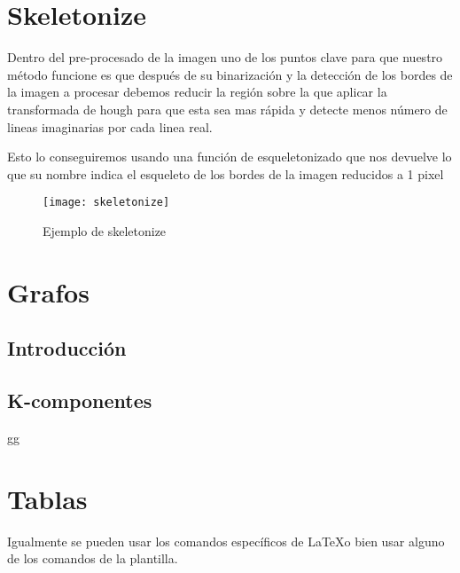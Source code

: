 \section{Skeletonize \cite{scik:skeleton}}
Dentro del pre-procesado de la imagen uno de los puntos clave para que nuestro método funcione es que después de su binarización y la detección de los bordes de la imagen a procesar debemos reducir la región sobre la que aplicar la transformada de hough para que esta sea mas rápida y detecte menos número de lineas imaginarias por cada linea real.

Esto lo conseguiremos usando una función de esqueletonizado que nos devuelve lo que su nombre indica el esqueleto de los bordes de la imagen reducidos a 1 pixel \cite{scik:skeleton}
\begin{figure}[h]
\centering
\texttt{[image: skeletonize]}
\caption{Ejemplo de skeletonize}
\end{figure}


\section{Grafos}
	
\subsection{Introducción}
\subsection{K-componentes}
gg\\



\section{Tablas}

Igualmente se pueden usar los comandos específicos de \LaTeX o bien usar alguno de los comandos de la plantilla.

